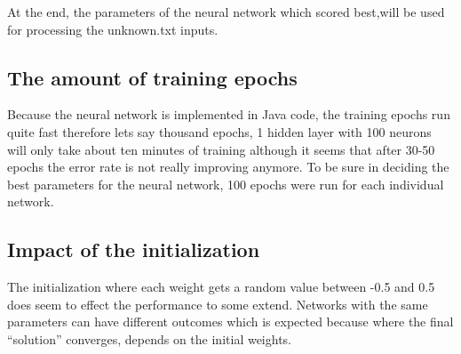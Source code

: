 At the end, the parameters of the neural network which scored best,will be used for processing the unknown.txt inputs. 

 \subsection{The amount of training epochs}
 Because the neural network is implemented in Java code, the training epochs run quite fast therefore lets say thousand epochs, 1 hidden layer with 100 neurons will only take about ten minutes of training although it seems that after 30-50 epochs the error rate is not really improving anymore. To be sure in deciding the best parameters for the neural network, 100 epochs were run for each individual network.
 
 \subsection{Impact of the initialization}
 The initialization where each weight gets a random value between -0.5 and 0.5 does seem to effect the performance to some extend. Networks with the same parameters can have different outcomes which is expected because where the final \enquote{solution} converges, depends on the initial weights. 